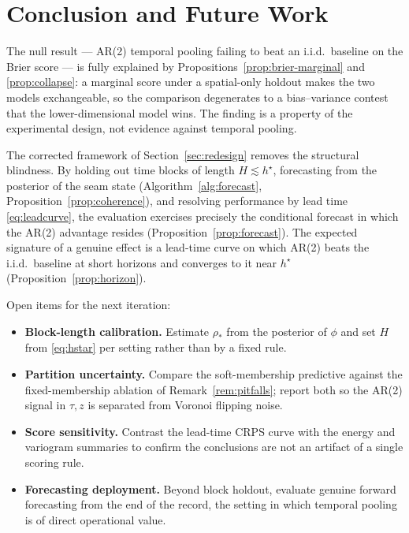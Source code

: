 \documentclass[11pt]{article}
\theoremstyle{definition}
\theoremstyle{remark}
\newcommand{\spradius}{\rho_{\!*}}
\begin{document}
\section{Conclusion and Future Work}
\label{sec:conclusion}

The null result --- AR(2) temporal pooling failing to beat an
i.i.d.\ baseline on the Brier score --- is fully explained by
Propositions~\ref{prop:brier-marginal} and \ref{prop:collapse}: a
marginal score under a spatial-only holdout makes the two models
exchangeable, so the comparison degenerates to a bias--variance contest
that the lower-dimensional model wins. The finding is a property of the
experimental design, not evidence against temporal pooling.

The corrected framework of Section~\ref{sec:redesign} removes the
structural blindness. By holding out time blocks of length $H\lesssim
h^\star$, forecasting from the posterior of the seam state
(Algorithm~\ref{alg:forecast}, Proposition~\ref{prop:coherence}), and
resolving performance by lead time \eqref{eq:leadcurve}, the evaluation
exercises precisely the conditional forecast in which the AR(2)
advantage resides (Proposition~\ref{prop:forecast}). The expected
signature of a genuine effect is a lead-time curve on which AR(2) beats
the i.i.d.\ baseline at short horizons and converges to it near
$h^\star$ (Proposition~\ref{prop:horizon}).

Open items for the next iteration:
\begin{itemize}[leftmargin=1.4em]
  \item \textbf{Block-length calibration.} Estimate $\spradius$ from
        the posterior of $\phi$ and set $H$ from \eqref{eq:hstar} per
        setting rather than by a fixed rule.
  \item \textbf{Partition uncertainty.} Compare the soft-membership
        predictive against the fixed-membership ablation of
        Remark~\ref{rem:pitfalls}; report both so the AR(2) signal in
        $\tau,z$ is separated from Voronoi flipping noise.
  \item \textbf{Score sensitivity.} Contrast the lead-time CRPS curve
        with the energy and variogram summaries to confirm the
        conclusions are not an artifact of a single scoring rule.
  \item \textbf{Forecasting deployment.} Beyond block holdout, evaluate
        genuine forward forecasting from the end of the record, the
        setting in which temporal pooling is of direct operational
        value.
\end{itemize}
\end{document}
